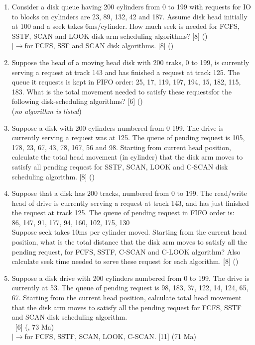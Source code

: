 \documentclass[12pt]{article}
\newcommand{\lb}{\\$\left|\rightarrow\right.$}
\newcommand{\enter}{\\\textcolor{white}{1}}
\begin{document}
\begin{enumerate}
			\item Consider a disk queue having 200 cylinders from 0 to 199 with requests for IO to blocks on cylinders are 23, 89, 132, 42 and 187. Assume disk head initially at 100 and a seek takes 6ms/cylinder. How much seek is needed for FCFS, SSTF, SCAN and LOOK disk arm scheduling algorithms? \hfill [8] ()
			\lb for FCFS, SSF and SCAN disk algorithms. \hfill [8] ()

			\item Suppose the head of a moving head disk with 200 traks, 0 to 199, is currently serving a request at track 143 and has finished a request at track 125. The queue it requests is kept in FIFO order: 25, 17, 119, 197, 194, 15, 182, 115, 183. What is the total movement needed to satisfy these requestsfor the following disk-scheduling algorithms? \hfill [6] ()\\
			(\textit{no algorithm is listed})

			\item Suppose a disk with 200 cylinders numbered from 0-199. The drive is currently serving a request was at 125. The queue of pending request is 105, 178, 23, 67, 43, 78, 167, 56 and 98. Starting from current head position, calculate the total head movement (in cylinder) that the disk arm moves to satisfy all pending request for SSTF, SCAN, LOOK and C-SCAN disk scheduling algorithm. \hfill [8] ()

			\item Suppose that a disk has 200 tracks, numbered from 0 to 199. The read/write head of drive is currently serving a request at track 143, and has just finished the request at track 125. The queue of pending request in FIFO order is:\\
			86, 147, 91, 177, 94, 160, 102, 175, 130\\
			Suppose seek takes 10ms per cylinder moved. Starting from the current head position, what is the total distance that the disk arm moves to satisfy all the pending request, for FCFS, SSTF, C-SCAN and C-LOOK algorithm? Also calculate seek time needed to serve these request for each algorithm. \hfill [8] ()

			\item Suppose a disk drive with 200 cylinders numbered from 0 to 199. The drive is currently at 53. The queue of pending request is 98, 183, 37, 122, 14, 124, 65, 67. Starting from the current head position, calculate total head movement that the disk arm moves to satisfy all the pending request for FCFS, SSTF and SCAN disk scheduling algorithm.
			\enter\hfill [6] (, 73 Ma)
			\lb for FCFS, SSTF, SCAN, LOOK, C-SCAN. \hfill [11] (71 Ma)


\end{enumerate}
\end{document}
